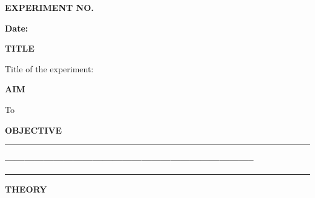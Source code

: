 \documentclass[11pt]{article}
\newcommand{\expheading}[1]{{\fontsize{14}{17}\selectfont\textbf{#1}}\par}
\newcommand{\fullrule}{\noindent\rule{\textwidth}{0.6pt}\par}
\begin{document}
\newpage

\begin{center}
\expheading{EXPERIMENT NO. \underline{\hspace{1.2cm}}}
\end{center}
\vspace{2pt}

\noindent\textbf{Date:} \underline{\hspace{2.6cm}}\par
\vspace{6pt}

\expheading{TITLE}
\vspace{4pt}
\noindent Title of the experiment: \hrulefill\par
\vspace{4pt}

\expheading{AIM}
\vspace{4pt}
\noindent To \underline{\hspace{13.8cm}}\par
\noindent\underline{\hspace*{\textwidth}}\par
\vspace{4pt}

\expheading{OBJECTIVE}
\vspace{2pt}
\fullrule
\vspace{4pt}
{\fontsize{14}{17}\selectfont\textbf{-----------------------------------------------------------------------------}}\par
\vspace{2pt}
\fullrule
\vspace{4pt}

\expheading{THEORY}
\vspace{4pt}
\noindent\underline{\hspace*{\textwidth}}\par
\noindent\underline{\hspace*{\textwidth}}\par
\noindent\underline{\hspace*{\textwidth}}\par
\noindent\underline{\hspace*{\textwidth}}\par
\vspace{4pt}
\end{document}
